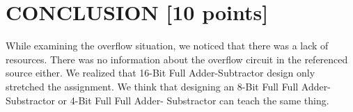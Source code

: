 \documentclass[pdftex,12pt,a4paper]{article}
\begin{document}
\section{CONCLUSION [10 points]}
While examining the overflow situation, we noticed that there was a lack of resources. There was no information about the overflow circuit in the referenced source either. We realized that 16-Bit Full Adder-Subtractor design only stretched the assignment. We think that designing an 8-Bit Full Full Adder- Substractor or 4-Bit Full Full Adder- Substractor can teach the same thing.

\newpage
{}



\end{document}
